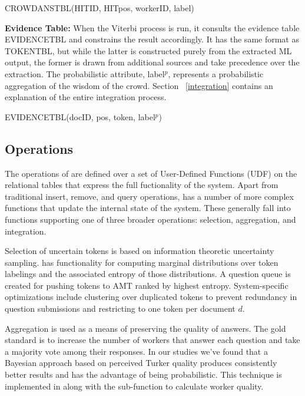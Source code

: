 \vspace{.1in}
\centerline{C{\small ROWD}A{\small NS}T{\small BL}(HITID, HITpos, workerID, label)}
\vspace{.1in}

\noindent\textbf{Evidence Table:} When the Viterbi process is run, it consults the evidence table E{\small VIDENCE}T{\small BL} and constrains the result accordingly.  It has the same format as T{\small OKEN}T{\small BL}, but while the latter is constructed purely from the extracted ML output, the former is drawn from additional sources and take precedence over the extraction.  The probabilistic attribute, label$^{p}$, represents a probabilistic aggregation of the wisdom of the crowd.  Section ~\ref{integration} contains an explanation of the entire integration process.

\vspace{.1in}
\centerline{E{\small VIDENCE}T{\small BL}(docID, pos, token, label$^{p}$)}
\vspace{.1in}

\subsection{\sysName Operations}

The operations of \sysName are defined over a set of User-Defined Functions (UDF) on the relational tables that express the full fuctionality of the system.  Apart from traditional insert, remove, and query operations, \sysName has a number of more complex functions that update the internal state of the system.  These generally fall into functions supporting one of three broader operations: selection, aggregation, and integration.

Selection of uncertain tokens is based on information theoretic uncertainty sampling.  \sysName has functionality for computing marginal distributions over token labelings and the associated entropy of those distributions.  A question queue is created for pushing tokens to AMT ranked by highest entropy.  System-specific optimizations include clustering over duplicated tokens to prevent redundancy in question submissions and restricting to one token per document $d$.

Aggregation is used as a means of preserving the quality of answers.  The gold standard is to increase the number of workers that answer each question and take a majority vote among their responses.  In our studies we've found that a Bayesian approach based on perceived Turker quality produces consistently better results and has the advantage of being probabilistic.  This technique is implemented in \sysName along with the sub-function to calculate worker quality.

